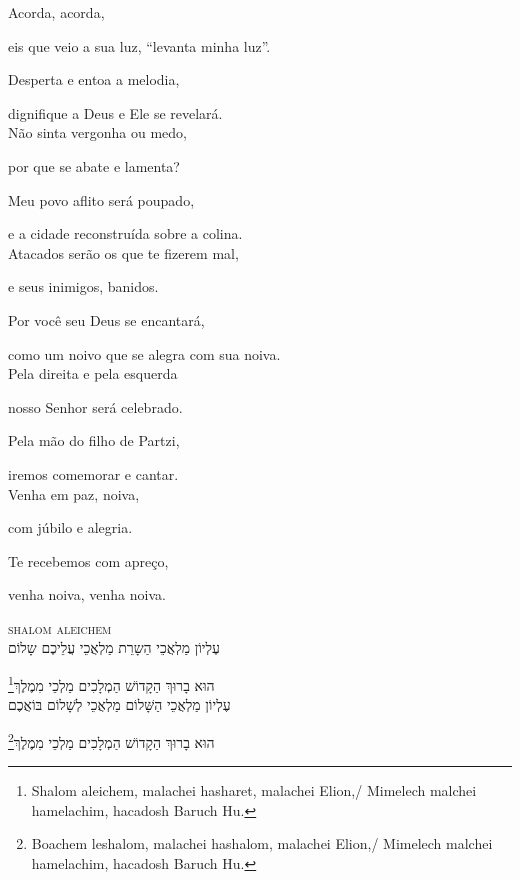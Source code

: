 Acorda, acorda,

eis que veio a sua luz, ``levanta minha luz''.

Desperta e entoa a melodia,

dignifique a Deus e Ele se revelará.\\[10pt]


Não sinta vergonha ou medo,

por que se abate e lamenta?

Meu povo aflito será poupado,

e a cidade reconstruída sobre a colina.\\[10pt]

Atacados serão os que te fizerem mal,

e seus inimigos, banidos.

Por você seu Deus se encantará,

como um noivo que se alegra com sua noiva.\\[10pt]

Pela direita e pela esquerda

nosso Senhor será celebrado.

Pela mão do filho de Partzi,

iremos comemorar e cantar.\\[10pt]

Venha em paz, noiva,

com júbilo e alegria.

Te recebemos com apreço,

venha noiva, venha noiva.


\movetoevenpage
\raggedleft
{}

\vspace*{1cm}

\textsc{shalom aleichem}\\[15pt]

עֶלְיוֹן מַלְאֲכֵי הַשָרֵת מַלְאֲכֵי עֲלֵיכֶם שָלוֹם

\footnote{Shalom aleichem, malachei hasharet, malachei Elion,/ Mimelech malchei hamelachim, hacadosh Baruch Hu.}הוּא בָרוּךְ הַקָדוֹשׁ הַמְלָכִים מַלְכֵי מִמֶלֶךְ\\[10pt]

עֶלְיוֹן מַלְאֲכֵי הַשָּׁלוֹם מַלְאֲכֵי לְשָׁלוֹם בּוֹאֲכֶם

\footnote{Boachem leshalom, malachei hashalom, malachei Elion,/ Mimelech malchei hamelachim, hacadosh Baruch Hu.}הוּא בָרוּךְ הַקָדוֹשׁ הַמְלָכִים מַלְכֵי מִמֶלֶךְ\\[10pt]

